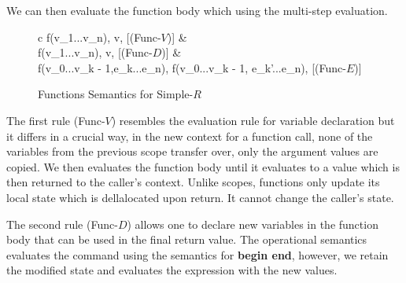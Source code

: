 \documentclass[a4paper,12pt]{report}
\begin{document}
\par
We can then evaluate the function body which using the multi-step evaluation.

\begin{figure}[H]
  \begin{center}
    \begin{tabular} {c}
      {\langle f(v_1...v_n), \sigma \rangle \Longrightarrow \langle v, \sigma \rangle} [(Func-$V$)]
      & \\
      {\langle f(v_1...v_n), \sigma \rangle \Longrightarrow \langle v, \sigma \rangle} [(Func-$D$)]
      & \\
      {\langle f(v_0...v_{k - 1},e_k...e_n), \sigma \rangle \Longrightarrow \langle f(v_0...v_{k - 1}, e_{k}'...e_n), \sigma \rangle} [(Func-$E$)]
    \end{tabular}
  \end{center}
  \caption{Functions Semantics for Simple-$R$}
\end{figure}

\par
The first rule (Func-$V$) resembles the evaluation rule for 
variable declaration but it differs in a crucial way, in the new context for a 
function call, none of the variables from the previous scope transfer over, only 
the argument values are copied. We then evaluates the function body until it 
evaluates to a value which is then returned to the caller's context. Unlike 
scopes, functions only update its local state which is dellalocated upon return. 
It cannot change the caller's state. 

\par
The second rule (Func-$D$) allows one to declare new variables in the function 
body that can be used in the final return value. The operational semantics 
evaluates the command using the semantics for \textbf{begin end}, however, we 
retain the modified state and evaluates the expression with the new values. 
\end{document}

